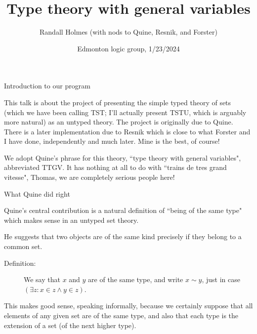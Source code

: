 \documentclass{slides}
\title{Type theory with general variables}
\author{Randall Holmes (with nods to Quine, Resnik, and Forster)}
\date{Edmonton logic group, 1/23/2024}
\begin{document}
\begin{slide}

\maketitle

\end{slide}

\begin{slide}

{\Large Introduction to our program}

This talk is about the project of presenting the simple typed theory of sets (which we have been calling TST;  I'll actually present TSTU, which is arguably more natural) as an untyped theory.  The project is originally due to Quine.  There is a later implementation due to Resnik which is close to what Forster and I have done, independently and much later.  Mine is the best, of course!

We adopt Quine's phrase for this theory, ``type theory with general variables", abbreviated TTGV.  It has nothing at all to do with ``trains de tres grand vitesse", Thomas, we are completely serious people here!

\end{slide}

\begin{slide}

{\Large What Quine did right}

Quine's central contribution is a natural definition of ``being of the same type" which makes sense in an untyped set theory.

He suggests that two objects are of the same kind precisely if they belong to a common set.

\begin{description}

\item[Definition:]  We say that $x$ and $y$ are of the same type, and write $x \sim y$, just in case $(\exists z:x \in z \wedge y \in z)$.

\end{description}

This makes good sense, speaking informally, because we certainly suppose that all elements of any given set are of the same type, and also
that each type is the extension of a set (of the next higher type).

\end{slide}
\end{document}
